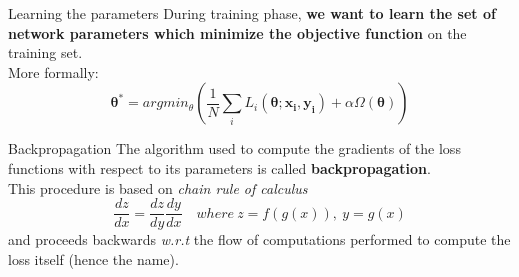 \documentclass[aspectratio=169]{beamer}
\begin{document}


\begin{frame}{Learning the parameters}
During training phase, \textbf{we want to learn the set of network parameters which minimize the objective function} on the training set.\\
\vspace{0.5cm}
More formally:
\begin{equation*}
\bm{\theta}^* = argmin_{\theta} \left(\frac{1}{N} \sum_i L_i(\bm{\theta}; \mathbf{x_i, y_i}) + \alpha \Omega (\bm{\theta})\right)
\end{equation*}
\end{frame}

\begin{frame}{Backpropagation}
The algorithm used to compute the gradients of the loss functions with respect to its parameters is called \textbf{backpropagation}.\\
\vspace{0.5cm}
This procedure is based on \textit{chain rule of calculus}
\begin{equation*}
\frac{dz}{dx} = \frac{dz}{dy}\frac{dy}{dx} \quad where\ z = f(g(x)),\ y = g(x) 
\end{equation*}
and proceeds backwards \textit{w.r.t} the flow of computations performed to compute the loss itself (hence the name).

\end{frame}

\end{document}

